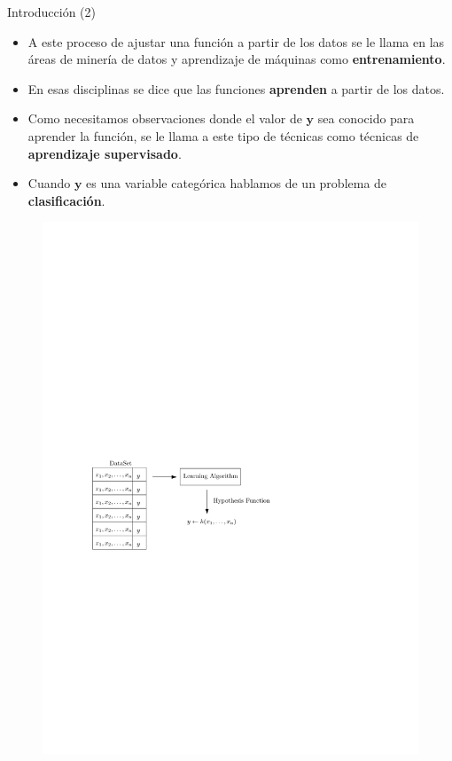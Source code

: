 \documentclass[handout]{beamer}
\begin{document}
\begin{frame}{Introducción (2)}
\scriptsize{
\begin{itemize}
 
 \item A este proceso de ajustar una función a partir de los datos se le llama en las áreas de minería de datos y aprendizaje de máquinas como \textbf{entrenamiento}.

 \item En esas disciplinas se dice que las funciones \textbf{aprenden} a partir de los datos.
 
 \item Como necesitamos observaciones donde el valor de $\mathbf{y}$ sea conocido para aprender la función,  se le llama a este tipo de técnicas como técnicas de \textbf{aprendizaje supervisado}.
 
 \item Cuando $\mathbf{y}$ es una variable categórica hablamos de un problema de \textbf{clasificación}.
 

 
\end{itemize}


\begin{figure}[h!]
	\centering
	\includegraphics[scale=0.65]{imagenes/learning.pdf}
\end{figure}

} 
 
\end{frame}
\end{document}
